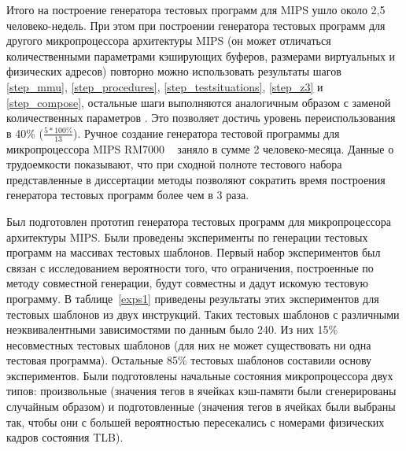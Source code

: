 \documentclass[14pt]{extreport}
\begin{document}
Итого на построение генератора тестовых программ для MIPS ушло около
2,5 человеко-недель. При этом при построении генератора тестовых
программ для другого микропроцессора архитектуры MIPS (он может
отличаться количественными параметрами кэширующих буферов, размерами
виртуальных и физических адресов) повторно можно использовать
результаты шагов \ref{step_mmu}, \ref{step_procedures},
\ref{step_testsituations}, \ref{step_z3} и \ref{step_compose},
остальные шаги выполняются аналогичным образом с заменой
количественных параметров . Это позволяет достичь уровень
переиспользования в 40\% ($\frac{5 * 100\%}{13}$). Ручное создание
генератора тестовой программы для микропроцессора MIPS RM7000
~\cite{kamkin} заняло в сумме 2 человеко-месяца. Данные о
трудоемкости показывают, что при сходной полноте тестового набора
представленные в диссертации методы позволяют сократить время
построения генератора тестовых программ более чем в 3 раза.

Был подготовлен прототип генератора тестовых программ для
микропроцессора архитектуры MIPS. Были проведены эксперименты по
генерации тестовых программ на массивах тестовых шаблонов. Первый
набор экспериментов был связан с исследованием вероятности того, что
ограничения, построенные по методу совместной генерации, будут
совместны и дадут искомую тестовую программу. В таблице~\ref{exps1}
приведены результаты этих экспериментов для тестовых шаблонов из
двух инструкций. Таких тестовых шаблонов с различными
неэквивалентными зависимостями по данным было 240. Из них 15\%
несовместных тестовых шаблонов (для них не может существовать ни
одна тестовая программа). Остальные 85\% тестовых шаблонов составили
основу экспериментов. Были подготовлены начальные состояния
микропроцессора двух типов: произвольные (значения тегов в ячейках
кэш-памяти были сгенерированы случайным образом) и подготовленные
(значения тегов в ячейках были выбраны так, чтобы они с большей
вероятностью пересекались с номерами физических кадров состояния
TLB).
\end{document}
